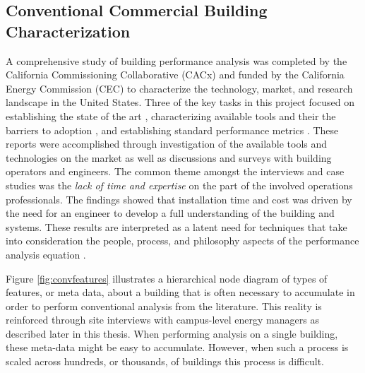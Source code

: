 \subsection{Conventional Commercial Building Characterization}
A comprehensive study of building performance analysis was completed by the California Commissioning Collaborative (CACx) and funded by the California Energy Commission (CEC) to characterize the technology, market, and research landscape in the United States. Three of the key tasks in this project focused on establishing the state of the art \cite{effinger_building_2010}, characterizing available tools and their the barriers to adoption \cite{ulickey_building_2010}, and establishing standard performance metrics \cite{greensfelder_building_2010}. These reports were accomplished through investigation of the available tools and technologies on the market as well as discussions and surveys with building operators and engineers. The common theme amongst the interviews and case studies was the \emph{lack of time and expertise} on the part of the involved operations professionals. The findings showed that installation time and cost was driven by the need for an engineer to develop a full understanding of the building and systems. These results are interpreted as a latent need for techniques that take into consideration the people, process, and philosophy aspects of the performance analysis equation \cite{miller_applicability_2013}. 

Figure \ref{fig:convfeatures} illustrates a hierarchical node diagram of types of features, or meta data, about a building that is often necessary to accumulate in order to perform conventional analysis from the literature. This reality is reinforced through site interviews with campus-level energy managers as described later in this thesis. When performing analysis on a single building, these meta-data might be easy to accumulate. However, when such a process is scaled across hundreds, or thousands, of buildings this process is difficult.

